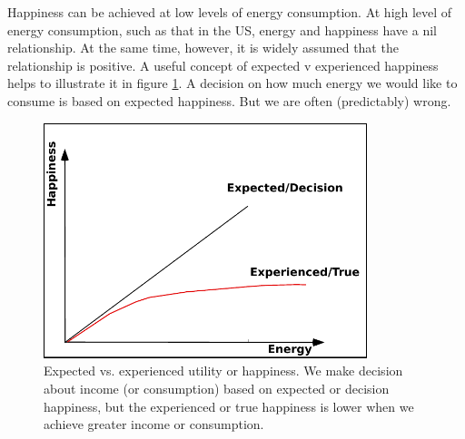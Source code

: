 \documentclass[10pt, letterpaper]{article}
\begin{document}
\begin{spacing}{1.4}
%

Happiness can be achieved at low levels of
energy consumption. At high level of energy consumption, such as
that in the  US, energy and happiness have a nil relationship. %
At the same time, however, it is widely assumed that the relationship is
positive. A useful concept of expected v experienced happiness helps to
illustrate it \cite{kahneman97ws} in figure \ref{fUT}. A decision on how much
energy we would like to  consume is based on expected happiness. But we are often (predictably) wrong.

\begin{figure}[H]
  \begin{centering}
    \includegraphics[height=2.7in]{graphsAndTables/utility}
    \caption{Expected vs. experienced utility or happiness. We make
      decision about income (or consumption) based on expected or
      decision happiness, but the experienced or true happiness is
      lower when we achieve greater  income or consumption.}\label{fUT}
  \end{centering}
\end{figure}



\end{spacing}
\end{document}
